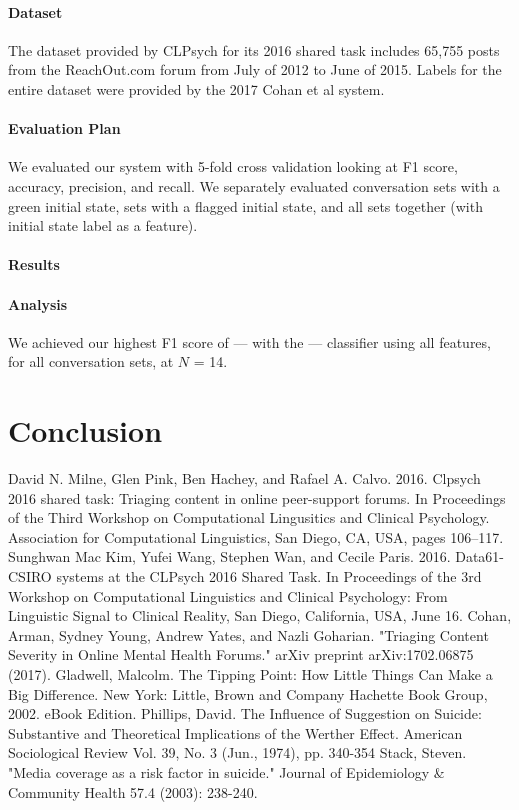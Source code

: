 \documentclass{article}
\begin{document}
\paragraph{Dataset}The dataset provided by CLPsych for its 2016 shared task includes 65,755 posts from the ReachOut.com forum from July of 2012 to June of 2015. Labels for the entire dataset were provided by the 2017 Cohan et al system.

\paragraph{Evaluation Plan}We evaluated our system with 5-fold cross validation looking at F1 score, accuracy, precision, and recall. We separately evaluated conversation sets with a green initial state, sets with a flagged initial state, and all sets together (with initial state label as a feature).

\paragraph{Results}

\paragraph{Analysis}We achieved our highest F1 score of --- with the --- classifier using all features, for all conversation sets, at $N$ = 14.

\section{Conclusion}

\begin{thebibliography}{9}

	David N. Milne, Glen Pink, Ben Hachey, and Rafael A. Calvo. 2016. Clpsych 2016 shared task: Triaging content in online peer-support forums. In Proceedings of the Third Workshop on Computational Lingusitics and Clinical Psychology. Association for Computational Linguistics, San Diego, CA, USA, pages 106–117.
	Sunghwan Mac Kim, Yufei Wang, Stephen Wan, and Cecile Paris. 2016. Data61-CSIRO systems at the CLPsych 2016 Shared Task. In Proceedings of the 3rd Workshop on Computational Linguistics and Clinical Psychology: From Linguistic Signal to Clinical Reality, San Diego, California, USA, June 16.
        Cohan, Arman, Sydney Young, Andrew Yates, and Nazli Goharian. "Triaging Content Severity in Online Mental Health Forums." arXiv preprint arXiv:1702.06875 (2017).
        Gladwell, Malcolm. The Tipping Point: How Little Things Can Make a Big Difference. New York: Little, Brown and Company Hachette Book Group, 2002. eBook Edition.
        Phillips, David. The Influence of Suggestion on Suicide: Substantive and Theoretical Implications of the Werther Effect. American Sociological Review Vol. 39, No. 3 (Jun., 1974), pp. 340-354
        Stack, Steven. "Media coverage as a risk factor in suicide." Journal of Epidemiology \& Community Health 57.4 (2003): 238-240.

\end{thebibliography}
\end{document}
